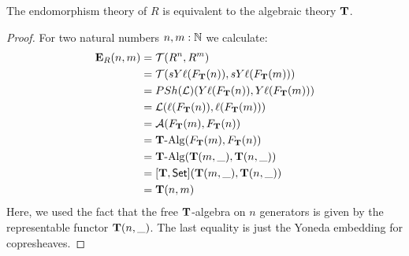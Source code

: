 {\begin{proposition}
  The endomorphism theory of \(R\) is equivalent to the algebraic theory \(\mathbf{T}\).
\end{proposition}
\begin{proof}
  For two natural numbers \(n,m:\mathbb{N}\) we calculate:
  \begin{align*}
    \mathbf{E}_R(n,m)
    &= \mathcal{T}(R^n,R^m)\\
    &= \mathcal{T}(sY\ell(F_{\mathbf{T}}(n)),sY\ell(F_{\mathbf{T}}(m)))\\
    &= \mathop{PSh}(\mathcal{L})(Y\ell(F_{\mathbf{T}}(n)),Y\ell(F_{\mathbf{T}}(m)))\\
    &= \mathcal{L}(\ell(F_{\mathbf{T}}(n)),\ell(F_{\mathbf{T}}(m)))\\
    & = \mathcal{A}(F_{\mathbf{T}}(m),F_{\mathbf{T}}(n))\\
    & = \mathbf{T}\text{-}\mathrm{Alg}(F_{\mathbf{T}}(m),F_{\mathbf{T}}(n))\\
    & = \mathbf{T}\text{-}\mathrm{Alg}(\mathbf{T}(m,\_),\mathbf{T}(n,\_))\\
    & = [\mathbf{T},\mathsf{Set}](\mathbf{T}(m,\_),\mathbf{T}(n,\_))\\
    & = \mathbf{T}(n,m)
  \end{align*}
Here, we used the fact that the free \(\mathbf{T}\)-algebra on \(n\) generators is given by the representable functor \(\mathbf{T}(n,\_)\).
The last equality is just the Yoneda embedding for copresheaves.
\end{proof}
}
